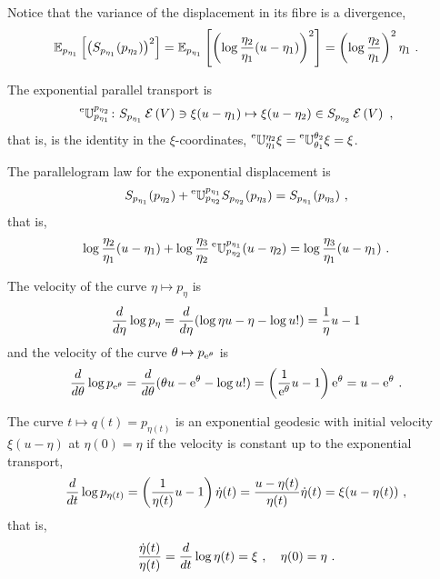 \documentclass[12pt,a4paper]{amsart}
\begin{document}
Notice that the variance of the displacement in its fibre is a divergence,
\begin{equation}
  \label{eq:22}
  \expectat {p_{\eta_1}} {\left(S_{p_{\eta_1}}(p_{\eta_2})\right)^2} =  \expectat {p_{\eta_1}} {\left(\log \frac {\eta_2}{\eta_1} (u - \eta_1)\right)^2} = \left(\log \frac {\eta_2}{\eta_1}\right)^2 \eta_1 \ .  
\end{equation}

The exponential parallel transport is
\begin{equation}
  \label{eq:10}
  \prescript{\text{e}}{} {\mathbb U} _ {p_{\eta_1}} ^ {p_{\eta_2}} \colon S_{p_{\eta_1}}\operatorname{\mathcal E}\left(V\right) \ni \xi(u - \eta_1) \mapsto \xi(u - \eta_2) \in S_{p_{\eta_2}}\operatorname{\mathcal E}\left(V\right) \ ,
\end{equation}
that is, is the identity in the $\xi$-coordinates, $\prescript{\text{e}}{} {\mathbb U} _ {\eta_1} ^ {\eta_2} \xi = \prescript{\text{e}}{} {\mathbb U} _ {\theta_1} ^ {\theta_2} \xi = \xi$.

The parallelogram law for the exponential displacement is 
\begin{equation}
  \label{eq:11}
  S_{p_{\eta_1}}(p_{\eta_2}) + \prescript{\text{e}}{} {\mathbb U} _ {p_{\eta_2}} ^ {p_{\eta_1}} S_{p_{\eta_2}}(p_{\eta_3}) = S_{p_{\eta_1}}(p_{\eta_3}) \ ,
\end{equation}
that is,
\begin{equation}
  \label{eq:12}
  \log \frac {\eta_2}{\eta_1}(u - \eta_1) + \log \frac {\eta_3}{\eta_2} \prescript{\text{e}}{} {\mathbb U} _ {p_{\eta_2}} ^ {p_{\eta_1}} (u - \eta_2) = \log \frac {\eta_3}{\eta_1}  (u - \eta_1) \ . 
\end{equation}

The velocity of the curve $\eta \mapsto p_\eta$ is
\begin{equation}
  \label{eq:13}
  \frac{d}{d\eta} \log p_\eta = \frac{d}{d\eta} (\log \eta u - \eta - \log u!) = \frac 1 \eta u - 1  
\end{equation}
and the velocity of the curve $\theta \mapsto p_{\mathrm{e}^\theta}$ is 
\begin{equation}
  \label{eq:14}
  \frac{d}{d\theta} \log p_{\mathrm{e}^\theta} = \frac{d}{d\theta} (\theta u - \mathrm{e}^\theta - \log u!) = \left(\frac 1 {\mathrm{e}^\theta} u - 1\right) \mathrm{e}^\theta = u - \mathrm{e}^\theta \ . 
\end{equation}

The curve $t \mapsto q(t) = p_{\eta(t)}$ is an exponential geodesic with initial velocity $\xi (u - \eta)$ at $\eta(0) = \eta$ if the velocity is constant up to the exponential transport,
\begin{equation}
  \label{eq:15}
  \frac{d}{dt} \log p_{\eta(t)} = \left(\frac 1 {\eta(t)} u - 1\right) \dot \eta(t) = \frac {u - \eta(t)} {\eta(t)} \dot \eta(t)=  \xi (u - \eta(t)) \ ,  
\end{equation}
that is,
\begin{equation}
  \label{eq:16}
  \frac {\dot \eta(t)} {\eta(t)} = \frac{d}{dt} \log \eta(t) = \xi \ , \quad  \eta(0) = \eta \ .
\end{equation}
\end{document}
